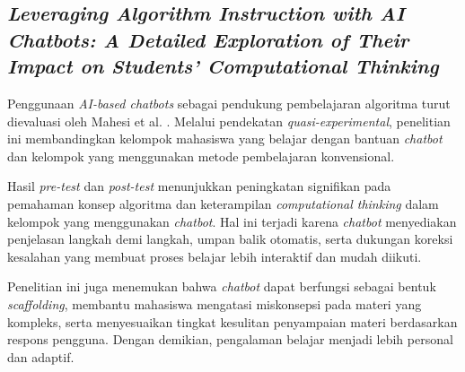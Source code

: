 \subsection{\textit{Leveraging Algorithm Instruction with AI Chatbots: A Detailed Exploration of Their Impact on Students' Computational Thinking}}

Penggunaan \textit{AI-based chatbots} sebagai pendukung pembelajaran algoritma turut dievaluasi oleh Mahesi et al. \cite{Zaus2025AlgorithmInstructionChatbots}. Melalui pendekatan \textit{quasi-experimental}, penelitian ini membandingkan kelompok mahasiswa yang belajar dengan bantuan \textit{chatbot} dan kelompok yang menggunakan metode pembelajaran konvensional.

Hasil \textit{pre-test} dan \textit{post-test} menunjukkan peningkatan signifikan pada pemahaman konsep algoritma dan keterampilan \textit{computational thinking} dalam kelompok yang menggunakan \textit{chatbot}. Hal ini terjadi karena \textit{chatbot} menyediakan penjelasan langkah demi langkah, umpan balik otomatis, serta dukungan koreksi kesalahan yang membuat proses belajar lebih interaktif dan mudah diikuti.

Penelitian ini juga menemukan bahwa \textit{chatbot} dapat berfungsi sebagai bentuk \textit{scaffolding}, membantu mahasiswa mengatasi miskonsepsi pada materi yang kompleks, serta menyesuaikan tingkat kesulitan penyampaian materi berdasarkan respons pengguna. Dengan demikian, pengalaman belajar menjadi lebih personal dan adaptif.
